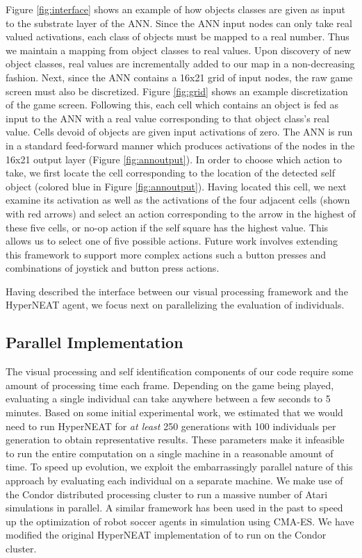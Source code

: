 \documentclass{acm_proc_article-sp}
\begin{document}
Figure \ref{fig:interface} shows an example of how objects classes are given as input to the substrate layer of the ANN. Since the ANN input nodes can only take real valued activations, each class of objects must be mapped to a real number. Thus we maintain a mapping from object classes to real values. Upon discovery of new object classes, real values are incrementally added to our map in a non-decreasing fashion. Next, since the ANN contains a 16x21 grid of input nodes, the raw game screen must also be discretized. Figure \ref{fig:grid} shows an example discretization of the game screen. Following this, each cell which contains an object is fed as input to the ANN with a real value corresponding to that object class's real value. Cells devoid of objects are given input activations of zero. The ANN is run in a standard feed-forward manner which produces activations of the nodes in the 16x21 output layer (Figure \ref{fig:annoutput}). In order to choose which action to take, we first locate the cell corresponding to the location of the detected self object (colored blue in Figure \ref{fig:annoutput}). Having located this cell, we next examine its activation as well as the activations of the four adjacent cells (shown with red arrows) and select an action corresponding to the arrow in the highest of these five cells, or no-op action if the self square has the highest value. This allows us to select one of five possible actions. Future work involves extending this framework to support more complex actions such a button presses and combinations of joystick and button press actions.

Having described the interface between our visual processing framework and the HyperNEAT agent, we focus next on parallelizing the evaluation of individuals.

\subsection{Parallel Implementation}
\label{sec:condor}
The visual processing and self identification components of our code require some amount of processing time each frame. Depending on the game being played, evaluating a single individual can take anywhere between a few seconds to 5 minutes. Based on some initial experimental work, we estimated that we would need to run HyperNEAT for \textit{at least} 250 generations with 100 individuals per generation to obtain representative results. These parameters make it infeasible to run the entire computation on a single machine in a reasonable amount of time. To speed up evolution, we exploit the embarrassingly parallel nature of this approach by evaluating each individual on a separate machine. We make use of the Condor distributed processing cluster \cite{thain2005distributed} to run a massive number of Atari simulations in parallel. A similar framework has been used in the past to speed up the optimization of robot soccer agents in simulation using CMA-ES\cite{Urieli+MKBS:2010}. We have modified the original HyperNEAT implementation of \cite{verbancsics10} to run on the Condor cluster.
\end{document}
